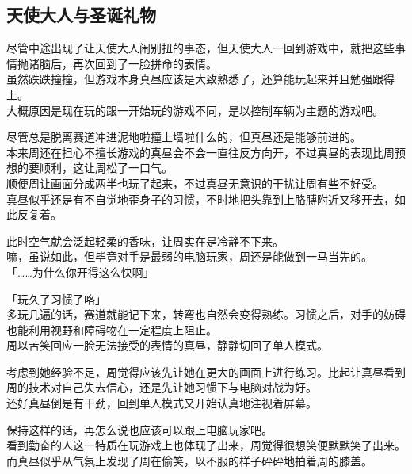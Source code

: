 \subsection{天使大人与圣诞礼物}

尽管中途出现了让天使大人闹别扭的事态，但天使大人一回到游戏中，就把这些事情抛诸脑后，再次回到了一脸拼命的表情。\\

虽然跌跌撞撞，但游戏本身真昼应该是大致熟悉了，还算能玩起来并且勉强跟得上。\\

大概原因是现在玩的跟一开始玩的游戏不同，是以控制车辆为主题的游戏吧。

尽管总是脱离赛道冲进泥地啦撞上墙啦什么的，但真昼还是能够前进的。\\

本来周还在担心不擅长游戏的真昼会不会一直往反方向开，不过真昼的表现比周预想的要顺利，这让周松了一口气。\\

顺便周让画面分成两半也玩了起来，不过真昼无意识的干扰让周有些不好受。\\

真昼似乎还是有不自觉地歪身子的习惯，不时地把头靠到上胳膊附近又移开去，如此反复着。

此时空气就会泛起轻柔的香味，让周实在是冷静不下来。\\

嘛，虽说如此，但毕竟对手是最弱的电脑玩家，周还是能做到一马当先的。\\

「……为什么你开得这么快啊」

「玩久了习惯了咯」\\

多玩几遍的话，赛道就能记下来，转弯也自然会变得熟练。习惯之后，对手的妨碍也能利用视野和障碍物在一定程度上阻止。\\

周以苦笑回应一脸无法接受的表情的真昼，静静切回了单人模式。

考虑到她经验不足，周觉得应该先让她在更大的画面上进行练习。比起让真昼看到周的技术对自己失去信心，还是先让她习惯下与电脑对战为好。\\

还好真昼倒是有干劲，回到单人模式又开始认真地注视着屏幕。

保持这样的话，再怎么说也应该可以跟上电脑玩家吧。\\

看到勤奋的人这一特质在玩游戏上也体现了出来，周觉得很想笑便默默笑了出来。而真昼似乎从气氛上发现了周在偷笑，以不服的样子砰砰地拍着周的膝盖。

